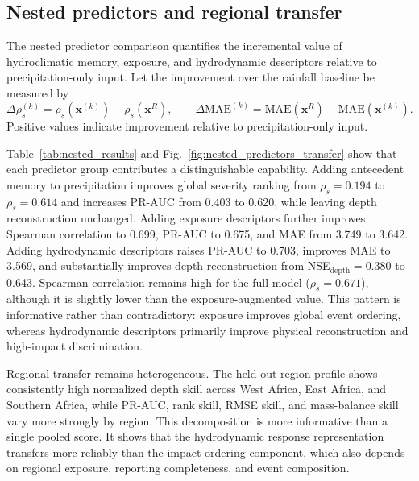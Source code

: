 \documentclass[pdflatex,sn-mathphys-ay]{sn-jnl}
\theoremstyle{thmstyleone}
\begin{document}
\subsection{Nested predictors and regional transfer}
\label{subsec:nested_transfer_results}

The nested predictor comparison quantifies the incremental value of
hydroclimatic memory, exposure, and hydrodynamic descriptors relative
to precipitation-only input.  Let the improvement over the rainfall
baseline be measured by
\begin{equation}
  \Delta \rho_s^{(k)}
  =
  \rho_s(\mathbf{x}^{(k)})-
  \rho_s(\mathbf{x}^{R}),
  \qquad
  \Delta \mathrm{MAE}^{(k)}
  =
  \mathrm{MAE}(\mathbf{x}^{R})-
  \mathrm{MAE}(\mathbf{x}^{(k)}).
  \label{eq:results_nested_gains}
\end{equation}
Positive values indicate improvement relative to precipitation-only
input.

Table~\ref{tab:nested_results} and
Fig.~\ref{fig:nested_predictors_transfer} show that each predictor
group contributes a distinguishable capability.  Adding antecedent
memory to precipitation improves global severity ranking from
$\rho_s=0.194$ to $\rho_s=0.614$ and increases PR-AUC from 0.403 to
0.620, while leaving depth reconstruction unchanged.  Adding exposure
descriptors further improves Spearman correlation to 0.699, PR-AUC to
0.675, and MAE from 3.749 to 3.642.  Adding hydrodynamic descriptors
raises PR-AUC to 0.703, improves MAE to 3.569, and substantially
improves depth reconstruction from NSE$_\mathrm{depth}=0.380$ to
0.643.  Spearman correlation remains high for the full model
($\rho_s=0.671$), although it is slightly lower than the
exposure-augmented value.  This pattern is informative rather than
contradictory: exposure improves global event ordering, whereas
hydrodynamic descriptors primarily improve physical reconstruction and
high-impact discrimination.

Regional transfer remains heterogeneous.  The held-out-region profile
shows consistently high normalized depth skill across West Africa, East
Africa, and Southern Africa, while PR-AUC, rank skill, RMSE skill, and
mass-balance skill vary more strongly by region.  This decomposition is
more informative than a single pooled score.  It shows that the
hydrodynamic response representation transfers more reliably than the
impact-ordering component, which also depends on regional exposure,
reporting completeness, and event composition.
\end{document}
